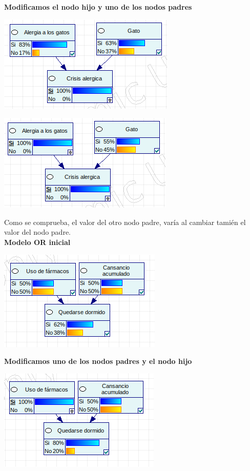 \documentclass{article}
\begin{document}
\textbf{Modificamos el nodo hijo y uno de los nodos padres}

\begin{center}
\includegraphics[scale=0.5]{AND4.png}
\end{center}

\begin{center}
\includegraphics[scale=0.5]{AND5.png}
\end{center}

Como se comprueba, el valor del otro nodo padre, varía al cambiar tamién el valor del nodo padre.\\

\textbf{Modelo OR inicial}

\begin{center}
\includegraphics[scale=0.5]{OR1.png}
\end{center}

\newpage

\textbf{Modificamos uno de los nodos padres y el nodo hijo}

\begin{center}
\includegraphics[scale=0.5]{OR2.png}
\end{center}
\end{document}
